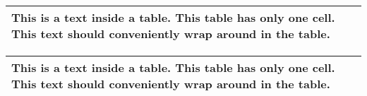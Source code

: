 \noindent
\begin{tabular}{|p{}|}
    \hline
    This is a text inside a table. This table has only one cell. This text should conveniently wrap around in the table.\\
    \hline
\end{tabular}

\noindent
\begin{tabular}{|p{}|}
    \hline
    This is a text inside a table. This table has only one cell. This text should conveniently wrap around in the table.\\
    \hline
    \hline
\end{tabular}
